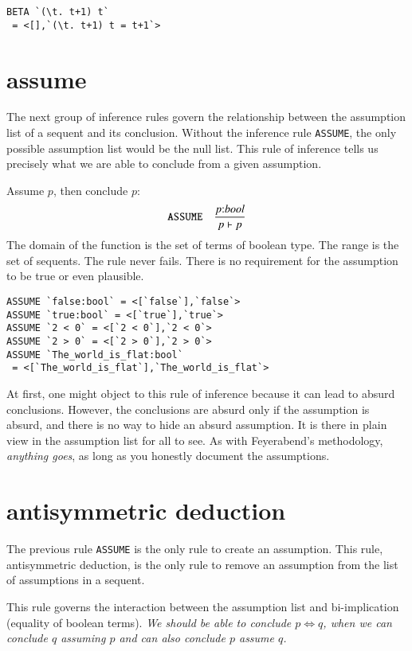 \begin{example}
\begin{verbatim}
BETA `(\t. t+1) t`
 = <[],`(\t. t+1) t = t+1`>
\end{verbatim}
\end{example}

\section{assume}

The next group of inference rules govern the relationship between the assumption list of a sequent and its conclusion.  Without the inference rule \verb!ASSUME!, the only possible assumption list would be the null list.  This rule of inference tells us precisely what we are able to conclude from a given assumption.

Assume $p$, then conclude $p$:
$$
\verb!ASSUME!\quad \frac{p\tc bool}
{p \vdash p}
$$
The domain of the function is the set of terms of boolean type.  The range is the set of sequents.  The rule never fails.  There is no requirement for the assumption to be true or even plausible.  
\begin{example}
\begin{verbatim}
ASSUME `false:bool` = <[`false`],`false`>
ASSUME `true:bool` = <[`true`],`true`>
ASSUME `2 < 0` = <[`2 < 0`],`2 < 0`>
ASSUME `2 > 0` = <[`2 > 0`],`2 > 0`>
ASSUME `The_world_is_flat:bool`
 = <[`The_world_is_flat`],`The_world_is_flat`>
\end{verbatim}
\end{example}
At first, one might object to this rule of inference because it can lead to absurd conclusions.  However, the conclusions are absurd only if the assumption is absurd, and there is no way to hide an absurd assumption.  It is there in plain view in the assumption list for all to see.  As with Feyerabend's methodology, {\it anything goes}, as long as you honestly document the assumptions.


\section{antisymmetric deduction}

The previous rule \verb!ASSUME!  is the only rule to create an assumption.  This rule,  antisymmetric deduction, is the only rule to remove an assumption from the list of assumptions in a sequent.  

This rule governs the interaction between the assumption list and bi-implication (equality of boolean terms).
{\it We should be able to conclude $p \Leftrightarrow q$, when we can conclude $q$ assuming $p$ and can also conclude $p$ assume $q$.}


